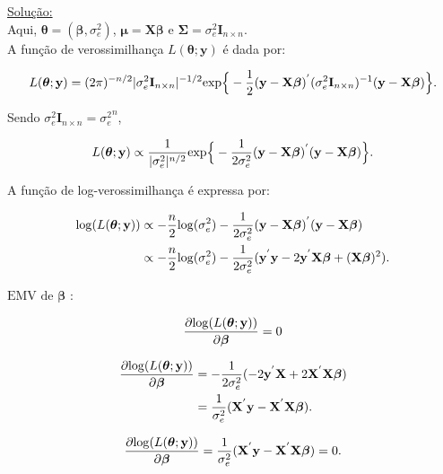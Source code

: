 \documentclass[12pt, oldfontcommands]{article}\usepackage[]{graphicx}\usepackage[]{color}
\begin{document}
\underline{Solução:} \\

Aqui, \(\bm{\theta} = (\bm{\beta}, \sigma_{e}^{2})\),
\(\bm{\mu} = \mathbf{X} \bm{\beta}\) e
\(\bm{\Sigma} = \sigma_{e}^{2}\mathbf{I}_{n \times n}\). \\

A função de verossimilhança \(L(\bm{\theta}; \mathbf{y})\) é dada por:

\[ L(\bm{\theta}; \mathbf{y}) = (2 \pi)^{-n/2}
   |\sigma_{e}^{2}\mathbf{I}_{n \times n}|^{-1/2} {\rm exp}\Big\{
   -\frac{1}{2}
   (\mathbf{y} - \mathbf{X} \bm{\beta})^{'}
   (\sigma_{e}^{2}\mathbf{I}_{n \times n})^{-1}
   (\mathbf{y} - \mathbf{X} \bm{\beta})\Big\}. \]

Sendo \(\sigma_{e}^{2}\mathbf{I}_{n \times n} = {\sigma_{e}^{2}}^{n}\),

\[ L(\bm{\theta}; \mathbf{y}) \propto \frac{1}{|\sigma_{e}^{2}|^{n/2}}
   {\rm exp}\Big\{-\frac{1}{2\sigma_{e}^{2}}
   (\mathbf{y} - \mathbf{X} \bm{\beta})^{'}
   (\mathbf{y} - \mathbf{X} \bm{\beta})\Big\}. \]

A função de log-verossimilhança é expressa por:

\begin{align*}
 {\rm log}(L(\bm{\theta}; \mathbf{y})) & \propto -\frac{n}{2}
 {\rm log}(\sigma_{e}^{2}) -\frac{1}{2\sigma_{e}^{2}}
 (\mathbf{y} - \mathbf{X} \bm{\beta})^{'}
 (\mathbf{y} - \mathbf{X} \bm{\beta}) \\ & \propto -\frac{n}{2}
 {\rm log}(\sigma_{e}^{2}) -\frac{1}{2\sigma_{e}^{2}}
 (\mathbf{y}^{'}\mathbf{y} - 2\mathbf{y}^{'}\mathbf{X}\bm{\beta} +
 (\mathbf{X}\bm{\beta})^{2}).
\end{align*}

\(\boxed{\text{EMV de } \bm{\beta}}\) :

\[ \frac{\partial
   {\rm log}(L(\bm{\theta}; \mathbf{y}))}{\partial \bm{\beta}} = 0 \]

\begin{align*}
 \frac{\partial
 {\rm log}(L(\bm{\theta}; \mathbf{y}))}{\partial \bm{\beta}} & =
 -\frac{1}{2\sigma_{e}^{2}} (-2\mathbf{y}^{'}\mathbf{X} +
 2\mathbf{X}^{'}\mathbf{X}\bm{\beta}) \\ & = \frac{1}{\sigma_{e}^{2}}
 (\mathbf{X}^{'}\mathbf{y} - \mathbf{X}^{'}\mathbf{X}\bm{\beta}).
\end{align*}

\[ \frac{\partial
   {\rm log}(L(\bm{\theta}; \mathbf{y}))}{\partial \bm{\beta}} =
   \frac{1}{\sigma_{e}^{2}}
   (\mathbf{X}^{'}\mathbf{y} - \mathbf{X}^{'}\mathbf{X}\bm{\beta}) = 0.
\]
\end{document}
